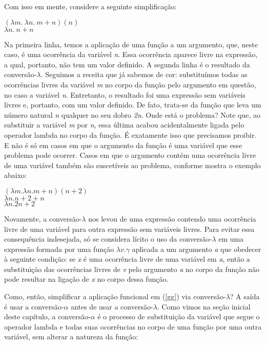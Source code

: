 Com isso em mente, considere a seguinte simplificação:

\begin{exe}
	\ex  $(\lambda m.\ \lambda n.\ m+n)(n)$\\
	$\lambda n.\ n+n$ \label{gg}
\end{exe}


\n Na primeira linha, temos a aplicação de uma função a um
argumento, que, neste caso, é uma ocorrência da variável
\textit{n}. Essa ocorrência aparece livre na expressão, a
qual, portanto, não tem um valor definido. A segunda linha é o
resultado da conversão-$\lambda$. Seguimos a receita que já
sabemos de cor: substituímos todas as ocorrências livres
da variável \textit{m} no corpo da função pelo argumento em
questão, no caso a variável \textit{n}. Entretanto, o resultado
foi uma expressão sem variáveis livres e, portanto, com um valor
definido. De fato, trata-se da função que leva um número natural
\textit{n} qualquer no seu dobro \textit{2n}. Onde está o
problema? Note que, ao substituir a variável \textit{m} por
\textit{n}, essa última acabou acidentalmente ligada pelo operador
lambda no corpo da função. É exatamente isso que precisamos
proibir. E não é só em casos em que o argumento da função é uma
variável que esse problema pode ocorrer. Casos em que o argumento
contém uma ocorrência livre de uma variável também são
suscetíveis ao problema, conforme mostra o exemplo abaixo:

\begin{exe}
	\ex $(\lambda m. \lambda n. m+n)(n+2)$\\
	$\lambda n. n+2+n$\\
	$\lambda n. 2n+2$\label{sl}
\end{exe}

\n Novamente, a conversão-$\lambda$ nos levou de uma expressão
contendo uma ocorrência livre de uma variável para outra
expressão sem variáveis livres. Para evitar essa consequência
indesejada, só se considera lícito o uso da conversão-$\lambda$ em
uma expressão formada por uma função $\lambda v. \gamma$
aplicada a um argumento \textit{a} que obedecer à seguinte
condição: se \textit{x} é uma ocorrência livre de uma
variável em \textit{a}, então a substituição das
ocorrências livres de \textit{v} pelo argumento \textit{a}
no corpo da função não pode resultar na ligação de \textit{x}
no corpo dessa função.

Como, então, simplificar a aplicação funcional em (\ref{gg})
via conversão-$\lambda$? A saída é usar a conversão-$\alpha$ antes
de usar a conversão-$\lambda$. Como vimos na seção inicial deste capítulo, a conversão-$\alpha$ é o processo de substituição da variável que segue o operador lambda e todas suas ocorrências no corpo de uma função por uma outra variável, sem alterar a natureza da função:\\

